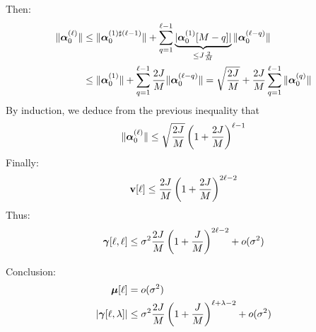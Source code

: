 Then:
\begin{align*}
\|\boldsymbol{\alpha}_0^{(\ell)}\| &\leq \|\boldsymbol{\alpha}_0^{(1)\sharp(\ell -1)}\| + \sum_{q=1}^{\ell-1}\underbrace{|\boldsymbol{\alpha}_0^{(1)}[M-q]|}_{\leq J\frac2M}\|\boldsymbol{\alpha}_0^{(\ell-q)}\| \\
&\leq \|\boldsymbol{\alpha}_0^{(1)}\| + \sum_{q=1}^{\ell-1}\dfrac{2J}M\|\boldsymbol{\alpha}_0^{(\ell-q)}\| = \sqrt{\dfrac{2J}M} + \dfrac{2J}M\sum_{q=1}^{\ell-1}\|\boldsymbol{\alpha}_0^{(q)}\|
\end{align*}
By induction, we deduce from the previous inequality that
\[
\|\boldsymbol{\alpha}_0^{(\ell)}\| \leq \sqrt{\dfrac{2J}M} \left( 1+ \dfrac{2J}M \right)^{\ell-1}
\]
Finally:
\[
{\mathbf v}[\ell] \leq \dfrac{2J}{M}\left( 1 + \dfrac{2J}{M}\right)^{2\ell-2}
\]
Thus:
\begin{equation*}
\boldsymbol{\gamma}[\ell,\ell] \leq \sigma^2\dfrac{2J}{M}\left( 1 + \dfrac{J}{M}\right)^{2\ell-2} + o(\sigma^2)
\end{equation*}

Conclusion:
\begin{align*}
\boldsymbol{\mu}[\ell] &= o(\sigma^2) \\
\left|\boldsymbol{\gamma}[\ell,\lambda]\right| &\leq \sigma^2\dfrac{2J}{M}\left( 1 + \dfrac{J}{M}\right)^{\ell+\lambda-2} + o(\sigma^2)
\end{align*}

